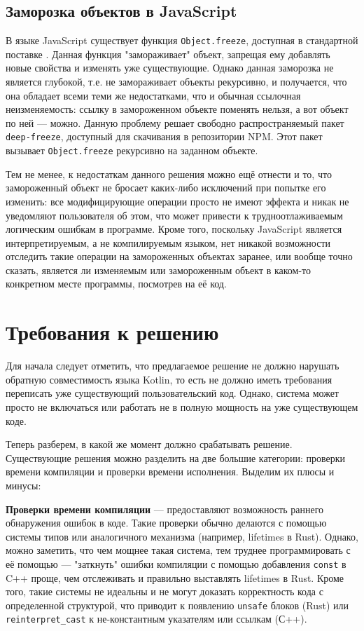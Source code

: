 \documentclass[specification,annotation,times]{itmo-student-thesis}
\begin{document}
\subsection{Заморозка объектов в JavaScript}\label{js_freeze}

В языке JavaScript существует функция \texttt{Object.freeze}, доступная в стандартной поставке \cite{EcmaScript}. Данная функция "замораживает" объект, запрещая ему добавлять новые свойства и изменять уже существующие.
Однако данная заморозка не является глубокой, т.е. не замораживает объекты рекурсивно, и получается, что она обладает всеми теми же недостатками, что и обычная ссылочная неизменяемость: ссылку в замороженном объекте поменять нельзя, а вот объект по ней --- можно.
Данную проблему решает свободно распространяемый пакет \texttt{deep-freeze}, доступный для скачивания в репозитории NPM. Этот пакет вызывает \texttt{Object.freeze} рекурсивно на заданном объекте.

Тем не менее, к недостаткам данного решения можно ещё отнести и то, что замороженный объект не бросает каких-либо исключений при попытке его изменить: все модифицирующие операции просто не имеют эффекта и никак не уведомляют пользователя об этом, что может привести к трудноотлаживаемым логическим ошибкам в программе. Кроме того, поскольку JavaScript является интерпретируемым, а не компилируемым языком, нет никакой возможности отследить такие операции на замороженных объектах заранее, или вообще точно сказать, является ли изменяемым или замороженным объект в каком-то конкретном месте программы, посмотрев на её код.

\section{Требования к решению}

Для начала следует отметить, что предлагаемое решение не должно нарушать обратную совместимость языка Kotlin, то есть не должно иметь требования переписать уже существующий пользовательский код. Однако, система может просто не включаться или работать не в полную мощность на уже существующем коде.

Теперь разберем, в какой же момент должно срабатывать решение. Существующие решения можно разделить на две большие категории: проверки времени компиляции и проверки времени исполнения.
Выделим их плюсы и минусы:

\textbf{Проверки времени компиляции} --- предоставляют возможность раннего обнаружения ошибок в коде. Такие проверки обычно делаются с помощью системы типов или аналогичного механизма (например, lifetimes в Rust).
Однако, можно заметить, что чем мощнее такая система, тем труднее программировать с её помощью --- "заткнуть" ошибки компиляции с помощью добавления \texttt{const} в C++ проще, чем отслеживать и правильно выставлять lifetimes в Rust.
Кроме того, такие системы не идеальны и не могут доказать корректность кода с определенной структурой, что приводит к появлению \texttt{unsafe} блоков (Rust) или \texttt{reinterpret\_cast} к не-константным указателям или ссылкам (С++).
\end{document}
